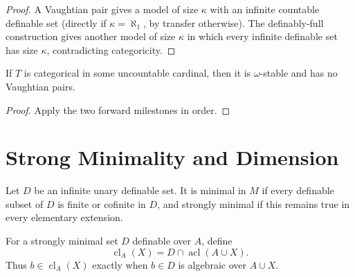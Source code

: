 \begin{proof}
A Vaughtian pair gives a model of size \(\kappa\) with an infinite
countable definable set (directly if \(\kappa=\aleph_1\), by transfer
otherwise).  The definably-full construction gives another model of
size \(\kappa\) in which every infinite definable set has size
\(\kappa\), contradicting categoricity.
\end{proof}

\begin{theorem}
\label{thm:uncountable-categoricity-implies-omega-stable-no-vaughtian-pairs}
If \(T\) is categorical in some uncountable cardinal, then it is
\(\omega\)-stable and has no Vaughtian pairs.
\end{theorem}

\begin{proof}
Apply the two forward milestones in order.
\end{proof}

\section{Strong Minimality and Dimension}

\begin{definition}
\label{def:minimality}
\leanok
Let \(D\) be an infinite unary definable set.  It is minimal in \(M\)
if every definable subset of \(D\) is finite or cofinite in \(D\), and
strongly minimal if this remains true in every elementary extension.
\end{definition}

\begin{definition}
\label{def:strongly-minimal-pregeometry}
\leanok
{}
For a strongly minimal set \(D\) definable over \(A\), define
\[
  \operatorname{cl}_A(X)=D\cap\operatorname{acl}(A\cup X).
\]
Thus \(b\in\operatorname{cl}_A(X)\) exactly when \(b\in D\) is
algebraic over \(A\cup X\).
\end{definition}

